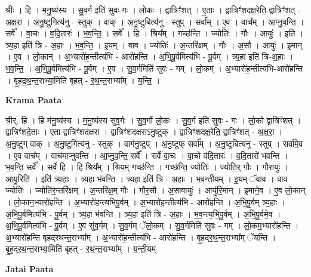 \documentclass[17pt]{extarticle}
\begin{document}
श्रीः । हि । म॒नु॒ष्य॑स्य । सु॒व॒र्ग इति॑ सुवः-गः । लो॒कः । द्वात्रिꣳ॑शत् । ए॒ताः । द्वात्रिꣳ॑शदक्ष॒रेति॒ द्वात्रिꣳ॑शत् - अ॒क्ष॒रा॒ । अ॒नु॒ष्टुगित्य॑नु - स्तुक् । वाक् । अ॒नु॒ष्टुबित्य॑नु - स्तुप् । सर्वा᳚म् । ए॒व । वाच᳚म् । आ॒प्नु॒व॒न्ति॒ । सर्वे᳚ । वा॒चः । व॒दि॒तारः॑ । भ॒व॒न्ति॒ । सर्वे᳚ । हि । श्रिय᳚म् । गच्छ॑न्ति । ज्योतिः॑ । गौः । आयुः॑ । इति॑ । त्र्य॒हा इति॑ त्रि - अ॒हाः । भ॒व॒न्ति॒ । इ॒यम् । वाव । ज्योतिः॑ । अ॒न्तरि॑क्षम् । गौः । अ॒सौ । आयुः॑ । इ॒मान् । ए॒व । लो॒कान् । अ॒भ्यारो॑ह॒न्तीत्य॑भि - आरो॑हन्ति । अ॒भि॒पू॒र्वमित्य॑भि - पू॒र्वम् । त्र्य॒हा इति॑ त्रि-अ॒हाः । भ॒व॒न्ति॒ । अ॒भि॒पू॒र्वमित्य॑भि - पू॒र्वम् । ए॒व । सु॒व॒र्गमिति॑ सुवः - गम् । लो॒कम् । अ॒भ्यारो॑ह॒न्तीत्य॑भि-आरो॑हन्ति । बृ॒ह॒द्र॒थ॒न्त॒राभ्या॒मिति॑ बृहत् - र॒थ॒न्त॒राभ्या᳚म् । य॒न्ति॒ ।  \newline


\textbf{Krama Paata} \newline

श्रीर्. हि । हि म॑नु॒ष्य॑स्य । म॒नु॒ष्य॑स्य सुव॒र्गः । सु॒व॒र्गो लो॒कः । सु॒व॒र्ग इति॑ सुवः - गः । लो॒को द्वात्रिꣳ॑शत् । द्वात्रिꣳ॑शदे॒ताः । ए॒ता द्वात्रिꣳ॑शदक्षरा । द्वात्रिꣳ॑शदक्षराऽनु॒ष्टुक् । द्वात्रिꣳ॑शदक्ष॒रेति॒ द्वात्रिꣳ॑शत् - अ॒क्ष॒रा॒ । अ॒नु॒ष्टुग् वाक् । अ॒नु॒ष्टुगित्य॑नु - स्तुक् । वाग॑नु॒ष्टुप् । अ॒नु॒ष्टुफ् सर्वा᳚म् । अ॒नु॒ष्टुबित्य॑नु - स्तुप् । सर्वा॑मे॒व । ए॒व वाच᳚म् । वाच॑माप्नुवन्ति । आ॒प्नु॒व॒न्ति॒ सर्वे᳚ । सर्वे॑ वा॒चः । वा॒चो व॑दि॒तारः॑ । व॒दि॒तारो॑ भवन्ति । भ॒व॒न्ति॒ सर्वे᳚ । सर्वे॒ हि । हि श्रिय᳚म् । श्रिय॒म् गच्छ॑न्ति । गच्छ॑न्ति॒ ज्योतिः॑ । ज्योति॒र् गौः । गौरायुः॑ । आयु॒रिति॑ । इति॑ त्र्य॒हाः । त्र्य॒हा भ॑वन्ति । त्र्य॒हा इति॑ त्रि - अ॒हाः । भ॒व॒न्ती॒यम् । इ॒यम् ॅवाव । वाव ज्योतिः॑ । ज्योति॑र॒न्तरि॑क्षम् । अ॒न्तरि॑क्ष॒म् गौः । गौर॒सौ । अ॒सावायुः॑ । आयु॑रि॒मान् । इ॒माने॒व । ए॒व लो॒कान् । लो॒कान॒भ्यारो॑हन्ति । अ॒भ्यारो॑हन्त्यभिपू॒र्वम् । अ॒भ्यारो॑ह॒न्तीत्य॑भि - आरो॑हन्ति । अ॒भि॒पू॒र्वम् त्र्य॒हाः । अ॒भि॒पू॒र्वमित्य॑भि - पू॒र्वम् । त्र्य॒हा भ॑वन्ति । त्र्य॒हा इति॑ त्रि - अ॒हाः । भ॒व॒न्त्य॒भि॒पू॒र्वम् । अ॒भि॒पू॒र्वमे॒व । अ॒भि॒पू॒र्वमित्य॑भि - पू॒र्वम् । ए॒व सु॑व॒र्गम् । सु॒व॒र्गम् ॅलो॒कम् । सु॒व॒र्गमिति॑ सुवः - गम् । लो॒कम॒भ्यारो॑हन्ति । अ॒भ्यारो॑हन्ति बृहद्‍रथन्त॒राभ्या᳚म् । अ॒भ्यारो॑ह॒न्तीत्य॑भि - आरो॑हन्ति । बृ॒ह॒द्‍र॒थ॒न्त॒राभ्या᳚म् ॅयन्ति । बृ॒ह॒द्‍र॒थ॒न्त॒राभ्या॒मिति॑ बृहत् - र॒थ॒न्त॒राभ्या᳚म् । य॒न्ती॒यम् \newline

\textbf{Jatai Paata} \newline
\end{document}
